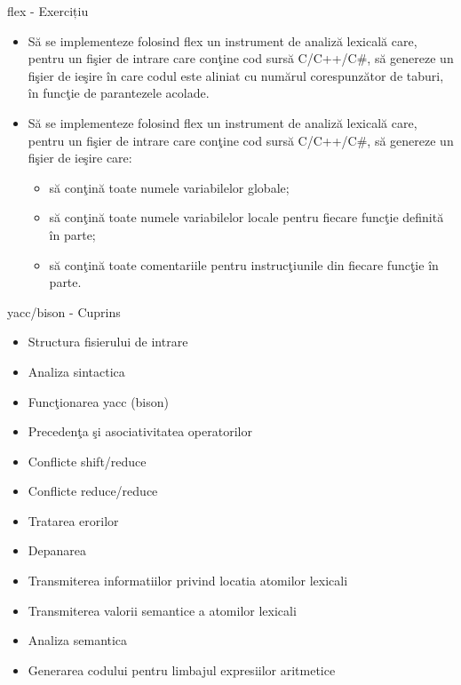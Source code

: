 \documentclass[pdf]{beamer}
\begin{document}
\begin{frame}{flex - Exercițiu}

\begin{itemize}
\item
Să se implementeze folosind flex un instrument de analiză lexicală care, pentru un fişier de intrare care conţine cod sursă C/C++/C\#, să genereze un fişier de ieşire în care codul este aliniat cu numărul corespunzător de taburi, în funcţie de parantezele acolade.

\item
Să se implementeze folosind flex un instrument de analiză lexicală care, pentru un fişier de intrare care conţine cod sursă C/C++/C\#, să genereze un fişier de ieşire care:
\begin{itemize}
\item
să conţină toate numele variabilelor globale;
\item
să conţină toate numele variabilelor locale pentru fiecare funcţie definită în parte;
\item
să conţină toate comentariile pentru instrucţiunile din fiecare funcţie în parte.
\end{itemize}
\end{itemize}
\end{frame}



\begin{frame}{yacc/bison - Cuprins}
\begin{itemize}
\item
Structura fisierului de intrare

\item
Analiza sintactica

\item
Funcţionarea yacc (bison)

\item
Precedenţa şi asociativitatea operatorilor

\item
Conflicte shift/reduce

\item
Conflicte reduce/reduce

\item
Tratarea erorilor

\item
Depanarea

\item
Transmiterea informatiilor privind locatia atomilor lexicali

\item
Transmiterea valorii semantice a atomilor lexicali

\item
Analiza semantica

\item
Generarea codului pentru limbajul expresiilor aritmetice

\end{itemize}
\end{frame}
\end{document}
